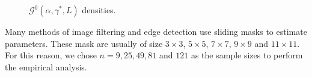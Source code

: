 \documentclass[twocolumn]{svjour3}
\begin{document}
\begin{figure}[hbt]
\centering
{}
\caption{$\mathcal{G}^0(\alpha,\gamma^*,L)$ densities.}\label{densidades} 
\end{figure}

Many methods of image filtering and edge detection use sliding masks to estimate parameters. 
These mask are usually of size $3 \times 3$, $5 \times 5$, $7 \times 7$, $9 \times 9$ and $11 \times 11$. 
For this reason, we chose $n=9,25,49,81$ and $121$ as the sample sizes to perform the empirical analysis.
\end{document}
